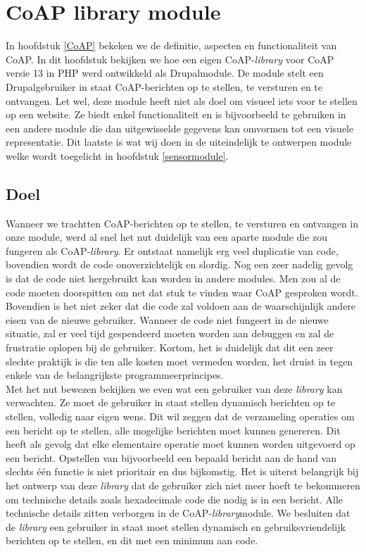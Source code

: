 \chapter{CoAP library module} \label{coaplibrary}

In hoofdstuk \ref{CoAP} bekeken we de definitie, aspecten en functionaliteit van CoAP. In dit hoofdstuk bekijken we hoe een eigen CoAP-\textit{library} voor CoAP versie 13 in PHP werd ontwikkeld als Drupalmodule. De module stelt een Drupalgebruiker in staat CoAP-berichten op te stellen, te versturen en te ontvangen. Let wel, deze module heeft niet als doel om visueel iets voor te stellen op een website. Ze biedt enkel functionaliteit en is bijvoorbeeld te gebruiken in een andere module die dan uitgewisselde gegevens kan omvormen tot een visuele representatie. Dit laatste is wat wij doen in de uiteindelijk te ontwerpen module welke wordt toegelicht in hoofdstuk \ref{sensormodule}.

\section{Doel}

Wanneer we trachtten CoAP-berichten op te stellen, te versturen en ontvangen in onze module, werd al snel het nut duidelijk van een aparte module die zou fungeren als CoAP-\textit{library}. Er ontstaat namelijk erg veel duplicatie van code, bovendien wordt de code onoverzichtelijk en slordig. Nog een zeer nadelig gevolg is dat de code niet hergebruikt kan worden in andere modules. Men zou al de code moeten doorspitten om net dat stuk te vinden waar CoAP gesproken wordt. Bovendien is het niet zeker dat die code zal voldoen aan de waarschijnlijk andere eisen van de nieuwe gebruiker. Wanneer de code niet fungeert in de nieuwe situatie, zal er veel tijd gespendeerd moeten worden aan debuggen en zal de frustratie oplopen bij de gebruiker. Kortom, het is duidelijk dat dit een zeer slechte praktijk is die ten alle kosten moet vermeden worden, het druist in tegen enkele van de belangrijkste programmeerprincipes.\\

\newpage
Met het nut bewezen bekijken we even wat een gebruiker van deze \textit{library} kan verwachten. Ze moet de gebruiker in staat stellen dynamisch berichten op te stellen, volledig naar eigen wens. Dit wil zeggen dat de verzameling operaties om een bericht op te stellen, alle mogelijke berichten moet kunnen genereren. Dit heeft als gevolg dat elke elementaire operatie moet kunnen worden uitgevoerd op een bericht. Opstellen van bijvoorbeeld een bepaald bericht aan de hand van slechts \'{e}\'{e}n functie is niet prioritair en dus bijkomstig. Het is uiterst belangrijk bij het ontwerp van deze \textit{library} dat de gebruiker zich niet meer hoeft te bekommeren om technische details zoals hexadecimale code die nodig is in een bericht. Alle technische details zitten verborgen in de CoAP-\textit{library}module. We besluiten dat de \textit{library} een gebruiker in staat moet stellen dynamisch en gebruiksvriendelijk berichten op te stellen, en dit met een minimum aan code.

